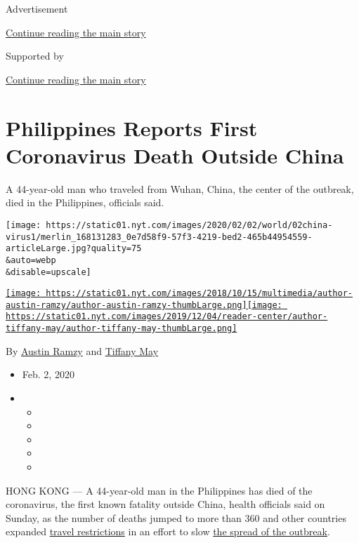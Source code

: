 Advertisement

\protect\hyperlink{after-top}{Continue reading the main story}

Supported by

\protect\hyperlink{after-sponsor}{Continue reading the main story}

\hypertarget{philippines-reports-first-coronavirus-death-outside-china}{%
\section{Philippines Reports First Coronavirus Death Outside
China}\label{philippines-reports-first-coronavirus-death-outside-china}}

A 44-year-old man who traveled from Wuhan, China, the center of the
outbreak, died in the Philippines, officials said.

\texttt{[image: https://static01.nyt.com/images/2020/02/02/world/02china-virus1/merlin\_168131283\_0e7d58f9-57f3-4219-bed2-465b44954559-articleLarge.jpg?quality=75\\\&auto=webp\\\&disable=upscale]}

\href{https://www.nytimes.com/by/austin-ramzy}{\texttt{[image: https://static01.nyt.com/images/2018/10/15/multimedia/author-austin-ramzy/author-austin-ramzy-thumbLarge.png]}}\href{https://www.nytimes.com/by/tiffany-may}{\texttt{[image: https://static01.nyt.com/images/2019/12/04/reader-center/author-tiffany-may/author-tiffany-may-thumbLarge.png]}}

By \href{https://www.nytimes.com/by/austin-ramzy}{Austin Ramzy} and
\href{https://www.nytimes.com/by/tiffany-may}{Tiffany May}

\begin{itemize}
\item
  Feb. 2, 2020
\item
  \begin{itemize}
  \item
  \item
  \item
  \item
  \item
  \end{itemize}
\end{itemize}

HONG KONG --- A 44-year-old man in the Philippines has died of the
coronavirus, the first known fatality outside China, health officials
said on Sunday, as the number of deaths jumped to more than 360 and
other countries expanded
\href{https://www.nytimes.com/2020/02/01/world/asia/china-coronavirus-us-australia.html}{travel
restrictions} in an effort to slow
\href{https://www.nytimes.com/interactive/2020/world/asia/china-coronavirus-contain.html}{the
spread of the outbreak}.

